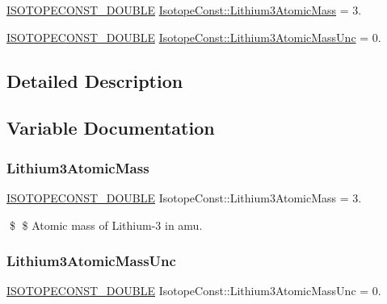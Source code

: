 \begin{DoxyCompactItemize}
\item 
\mbox{\hyperlink{group___isotope_const-_macros_ga8f45a7272ce02c0b4c65c44636ed719a}{I\+S\+O\+T\+O\+P\+E\+C\+O\+N\+S\+T\+\_\+\+D\+O\+U\+B\+LE}} \mbox{\hyperlink{group___isotope_const-_lithium-_li3_gac420000dd750048f53cb798cec12a9c0}{Isotope\+Const\+::\+Lithium3\+Atomic\+Mass}} = 3.
\item 
\mbox{\hyperlink{group___isotope_const-_macros_ga8f45a7272ce02c0b4c65c44636ed719a}{I\+S\+O\+T\+O\+P\+E\+C\+O\+N\+S\+T\+\_\+\+D\+O\+U\+B\+LE}} \mbox{\hyperlink{group___isotope_const-_lithium-_li3_ga62b64f3fec98d84162e44372a5d10d69}{Isotope\+Const\+::\+Lithium3\+Atomic\+Mass\+Unc}} = 0.
\end{DoxyCompactItemize}


\subsection{Detailed Description}


\subsection{Variable Documentation}
\mbox{\label{group___isotope_const-_lithium-_li3_gac420000dd750048f53cb798cec12a9c0}} 
\subsubsection{\texorpdfstring{Lithium3\+Atomic\+Mass}{Lithium3AtomicMass}}
{\footnotesize\ttfamily \mbox{\hyperlink{group___isotope_const-_macros_ga8f45a7272ce02c0b4c65c44636ed719a}{I\+S\+O\+T\+O\+P\+E\+C\+O\+N\+S\+T\+\_\+\+D\+O\+U\+B\+LE}} Isotope\+Const\+::\+Lithium3\+Atomic\+Mass = 3.}

\$ \$ Atomic mass of Lithium-\/3 in amu. \mbox{\label{group___isotope_const-_lithium-_li3_ga62b64f3fec98d84162e44372a5d10d69}} 
\subsubsection{\texorpdfstring{Lithium3\+Atomic\+Mass\+Unc}{Lithium3AtomicMassUnc}}
{\footnotesize\ttfamily \mbox{\hyperlink{group___isotope_const-_macros_ga8f45a7272ce02c0b4c65c44636ed719a}{I\+S\+O\+T\+O\+P\+E\+C\+O\+N\+S\+T\+\_\+\+D\+O\+U\+B\+LE}} Isotope\+Const\+::\+Lithium3\+Atomic\+Mass\+Unc = 0.}

